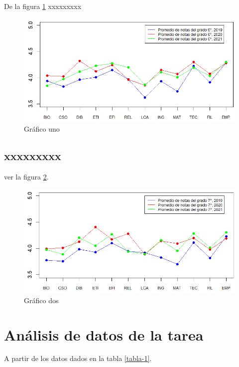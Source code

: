\documentclass[12pt,a4paper,]{book}
\numberwithin{dummy}{section}
\theoremstyle{ocrenumbox}
\theoremstyle{ocrenumbox}
\theoremstyle{ocrenumbox}
\theoremstyle{ocrenumbox}
\theoremstyle{ocrenum}
\begin{document}
De la figura \ref{fig:grafica1a} xxxxxxxxx

\begin{figure}[H]

{\centering \includegraphics[width=0.7\linewidth]{Graficas/graf3} 

}

\caption{Gráfico uno}\label{fig:grafica1a}
\end{figure}

\hypertarget{xxxxxxxxx}{%
\subsection{xxxxxxxxx}\label{xxxxxxxxx}}

ver la figura \ref{fig:grafica2a}.

\begin{figure}[H]

{\centering \includegraphics[width=0.7\linewidth]{Graficas/graf4} 

}

\caption{Gráfico dos}\label{fig:grafica2a}
\end{figure}

\hypertarget{anuxe1lisis-de-datos-de-la-tarea}{%
\section{Análisis de datos de la
tarea}\label{anuxe1lisis-de-datos-de-la-tarea}}

A partir de los datos dados en la tabla \ref{tabla-1}.
\end{document}
